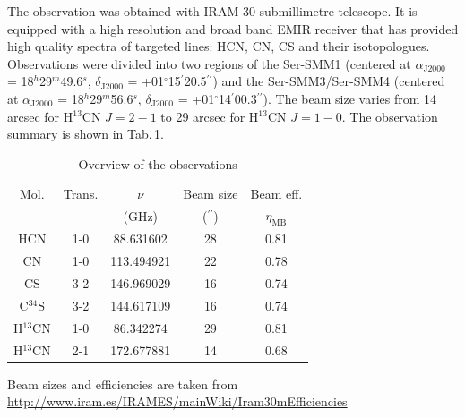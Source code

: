 \documentclass[a4paper]{article}
\begin{document}
\indent \indent The observation was obtained with IRAM 30 submillimetre telescope. It is equipped with a high resolution and broad band EMIR receiver that has provided high quality spectra of targeted lines: HCN, CN, CS and their isotopologues. Observations were divided into two regions of the Ser-SMM1 (centered at $\alpha_\mathrm{J2000}$ = 18$^h$29$^m$49.6$^s$, $\delta_\mathrm{J2000}$ = +01$^{\circ}$15$^{\prime}$20.5$^{\prime\prime}$) and the Ser-SMM3/Ser-SMM4 (centered at $\alpha_\mathrm{J2000}$ = 18$^h$29$^m$56.6$^s$, $\delta_\mathrm{J2000}$ = +01$^{\circ}$14$^{\prime}$00.3$^{\prime\prime}$). The beam size varies from 14 arcsec for H$^{13}$CN $J=2-1$ to 29 arcsec for H$^{13}$CN $J=1-0$. The observation summary is shown in Tab.\,\ref{tab:1}.
\begin{table}
\caption{Overview of the observations}             %
\label{tab:1}      %
\centering                          %
\begin{tabular}{c c c c c}        %
\hline\hline                 %
Mol. & Trans. & $\nu$ & Beam size & Beam eff.\\
 & & (GHz) & ($^{\prime\prime}$) & $\eta_\mathrm{MB}$\\
\hline                        %
HCN & 1-0 & 88.631602 & 28 & 0.81\\
CN & 1-0 & 113.494921 & 22 & 0.78\\
CS & 3-2 & 146.969029 & 16 & 0.74\\
C$^{34}$S & 3-2 & 144.617109 & 16 & 0.74\\
H$^{13}$CN & 1-0 & 86.342274 & 29 & 0.81\\
H$^{13}$CN & 2-1 & 172.677881 & 14 & 0.68\\
\hline                                   
\end{tabular}
\begin{flushleft}
Beam sizes and efficiencies are taken from \url{http://www.iram.es/IRAMES/mainWiki/Iram30mEfficiencies}
\end{flushleft}
\end{table}
\end{document}
